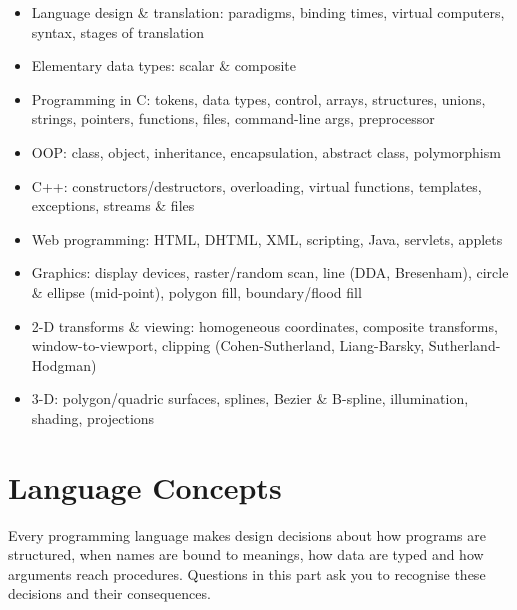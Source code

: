 

\begin{sylbox}

\begin{itemize}
\tightlist
\item[$\square$]
  Language design \& translation: paradigms, binding times, virtual computers, syntax, stages of translation
\item[$\square$]
  Elementary data types: scalar \& composite
\item[$\square$]
  Programming in C: tokens, data types, control, arrays, structures, unions, strings, pointers, functions, files, command-line args, preprocessor
\item[$\square$]
  OOP: class, object, inheritance, encapsulation, abstract class, polymorphism
\item[$\square$]
  C++: constructors/destructors, overloading, virtual functions, templates, exceptions, streams \& files
\item[$\square$]
  Web programming: HTML, DHTML, XML, scripting, Java, servlets, applets
\item[$\square$]
  Graphics: display devices, raster/random scan, line (DDA, Bresenham), circle \& ellipse (mid-point), polygon fill, boundary/flood fill
\item[$\square$]
  2-D transforms \& viewing: homogeneous coordinates, composite transforms, window-to-viewport, clipping (Cohen-Sutherland, Liang-Barsky, Sutherland-Hodgman)
\item[$\square$]
  3-D: polygon/quadric surfaces, splines, Bezier \& B-spline, illumination, shading, projections
\end{itemize}

\end{sylbox}

\needspace{161pt}

\hypertarget{p2-03--1-language-concepts}{%
\section{Language Concepts}\label{p2-03--1-language-concepts}}

Every programming language makes design decisions about how programs are structured, when names are
bound to meanings, how data are typed and how arguments reach procedures. Questions in this part ask you
to recognise these decisions and their consequences.


